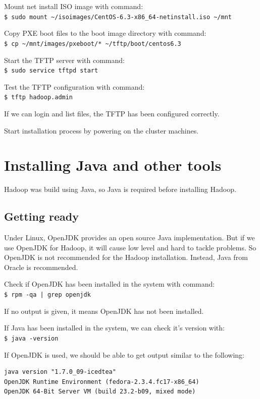 Mount net install ISO image with command: \\
\verb|$ sudo mount ~/isoimages/CentOS-6.3-x86_64-netinstall.iso ~/mnt|

Copy PXE boot files to the boot image directory with command: \\
\verb|$ cp ~/mnt/images/pxeboot/* ~/tftp/boot/centos6.3|

Start the TFTP server with command: \\
\verb|$ sudo service tftpd start|

Test the TFTP configuration with command: \\
\verb|$ tftp hadoop.admin|

If we can login and list files, the TFTP has been configured correctly.

Start installation process by powering on the cluster machines.

\section{Installing Java and other tools}
Hadoop was build using Java, so Java is required before installing Hadoop.

\subsection*{Getting ready}
Under Linux, OpenJDK provides an open source Java implementation. But if we use OpenJDK for Hadoop, it will cause low level and hard to tackle problems. So OpenJDK is not recommended for the Hadoop installation. Instead, Java from Oracle is recommended.

Check if OpenJDK has been installed in the system with command: \\
\verb+$ rpm -qa | grep openjdk+

If no output is given, it means OpenJDK has not been installed.

If Java has been installed in the system, we can check it's version with: \\
\verb|$ java -version|

If OpenJDK is used, we should be able to get output similar to the following:

\lstset{style=bashstyle}
\begin{lstlisting}
java version "1.7.0_09-icedtea"
OpenJDK Runtime Environment (fedora-2.3.4.fc17-x86_64)
OpenJDK 64-Bit Server VM (build 23.2-b09, mixed mode)
\end{lstlisting}

